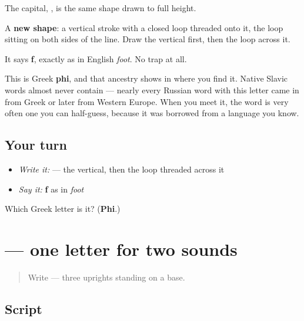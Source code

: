 \begin{quote}
   
\end{quote}

The capital, \textbf{}, is the same shape drawn to full height.

A \textbf{new shape}: a vertical stroke with a closed loop threaded onto it, the loop sitting on both sides of the line. Draw the vertical first, then the loop across it.

It says \textbf{f}, exactly as in English \emph{foot}. No trap at all.

This is Greek \textbf{phi}, and that ancestry shows in where you find it. Native Slavic words almost never contain  — nearly every Russian word with this letter came in from Greek or later from Western Europe. When you meet it, the word is very often one you can half-guess, because it was borrowed from a language you know.

\subsection*{Your turn}
\begin{itemize}
\raggedright
  \item \emph{Write it:}  — the vertical, then the loop threaded across it
  \item \emph{Say it:} \textbf{f} as in \emph{foot}
\end{itemize}

\begin{tcolorbox}[breakable,colback=teal!4,colframe=teal!35!black,title={Before you move on}]
Which Greek letter is it? (\textbf{Phi}.)
\end{tcolorbox}
\section[\texorpdfstring{\ru{ц} (ts)}{ц (ts)}]{ — one letter for two sounds}

\label{lesson:RU-W07-ts}



\begin{quote}
Write  — three uprights standing on a base.
\end{quote}

\subsection*{Script}

